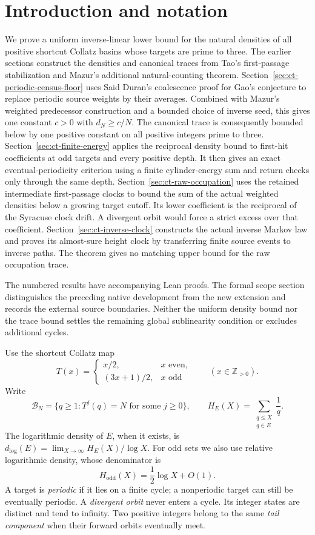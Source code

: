 \documentclass[11pt,a4paper]{article}
\begin{document}
\section{Introduction and notation}
\label{sec:canonical-traces}

We prove a uniform inverse-linear lower bound for the natural densities
of all positive shortcut Collatz basins whose targets are prime to
three. The earlier sections construct the densities and canonical
traces from Tao's first-passage stabilization and Mazur's additional
natural-counting theorem. Section~\ref{sec:ct-periodic-census-floor}
uses Said Duran's coalescence proof for Gao's conjecture to replace
periodic source weights by their averages. Combined with Mazur's
weighted predecessor construction and a bounded choice of inverse
seed, this gives one constant \(c>0\) with \(d_N\ge c/N\).
The canonical trace is consequently bounded below by one positive
constant on all positive integers prime to three.
Section~\ref{sec:ct-finite-energy} applies the reciprocal density bound
to first-hit coefficients at odd targets and every positive depth. It then gives an
exact eventual-periodicity criterion using a finite cylinder-energy sum
and return checks only through the same depth.
Section~\ref{sec:ct-raw-occupation} uses the retained intermediate
first-passage clocks to bound the sum of the actual weighted densities
below a growing target cutoff. Its lower coefficient is the reciprocal
of the Syracuse clock drift. A divergent orbit would force a strict
excess over that coefficient. Section~\ref{sec:ct-inverse-clock}
constructs the actual inverse Markov law and proves its almost-sure
height clock by transferring finite source events to inverse paths.
The theorem gives no matching upper bound for the raw occupation trace.

The numbered results have accompanying Lean proofs. The formal scope
section distinguishes the preceding native development from the new
extension and records the external source boundaries. Neither the
uniform density bound nor the trace bound settles the remaining global
sublinearity condition or excludes additional cycles.

Use the shortcut Collatz map
\[
T(x)=
\begin{cases}
x/2,&x\text{ even},\\
(3x+1)/2,&x\text{ odd}
\end{cases}
\qquad(x\in\mathbb Z_{>0}).
\]
Write
\[
 \mathcal B_N=\{q\ge1:T^j(q)=N\text{ for some }j\ge0\},
 \qquad
 H_E(X)=\sum_{\substack{q\le X\\q\in E}}\frac1q.
\]
The logarithmic density of \(E\), when it exists, is
\(d_{\log}(E)=\lim_{X\to\infty}H_E(X)/\log X\).
For odd sets we also use relative logarithmic density, whose
denominator is
\[
 H_{\mathrm{odd}}(X)=\frac12\log X+O(1).
\]
A target is \emph{periodic} if it lies on a finite cycle; a
nonperiodic target can still be eventually periodic. A
\emph{divergent orbit} never enters a cycle. Its integer states
are distinct and tend to infinity.
Two positive integers belong to the same \emph{tail component}
when their forward orbits eventually meet.
\end{document}
